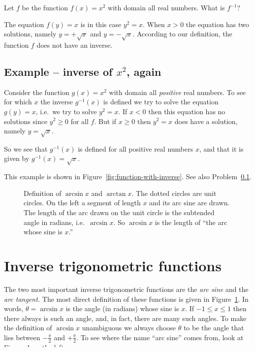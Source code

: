 Let $f$ be the function $f(x) = x^2$ with domain all real numbers.
What is $f^{-1}$?

The equation $f(y) = x$ is in this case $y^2=x$.  When $x>0$ the equation has
two solutions, namely $y=+\sqrt{x} $ and $y = -\sqrt{x}$.  According to our
definition, the function $f$ does not have an inverse.

\subsection{Example -- inverse of $x^2$, again}
\label{ex:inverse-of-square}%
Consider the function $g(x) = x^2$ with domain all \emph{positive} real
numbers.  To see for which $x$ the inverse $g^{-1}(x)$ is defined we
try to solve the equation $g(y) =x$, i.e.\ we try to solve $y^2 = x$.
If $x<0$ then this equation has no solutions since $y^2\geq0$ for all
$f$.  But if $x\geq 0$ then $y^2 = x$ does have a solution, namely $y
= \sqrt{x}$.

So we see that $g^{-1}(x)$ is defined for all positive real numbers
$x$, and that it is given by $g^{-1}(x) = \sqrt x$.

This example is shown in Figure~\ref{fig:function-with-inverse}.  See
also Problem~\ref{ex:inverse-of-square}.


\begin{figure}[b]
  \centering
  
  \caption{Definition of $\arcsin x$ and $\arctan x$.  The dotted
    circles are unit circles.  On the left a segment of length $x$ and
    its arc sine are drawn.  The length of the arc drawn on the unit
    circle is the subtended angle in radians, i.e.~$\arcsin x$.  So
    $\arcsin x$ is the length of ``the arc whose sine is $x$.''}
  \label{fig:01arcsine-arctan-definition}
\end{figure}

\section{Inverse trigonometric functions}
The two most important inverse trigonometric functions are the
\emph{arc sine} and the \emph{arc tangent.}  The most direct
definition of these functions is given in
Figure~\ref{fig:01arcsine-arctan-definition}.  In words, $\theta =
\arcsin x$ is the angle (in radians) whose sine is $x$.  If $-1\leq
x\leq 1$ then there always is such an angle, and, in fact, there are
many such angles.  To make the definition of $\arcsin x$ unambiguous
we always choose $\theta$ to be the angle that lies between
$-\frac\pi2$ and $+\frac\pi2$.  To see where the name ``arc sine''
comes from, look at Figure~\ref{fig:01arcsine-arctan-definition} on the
left.

